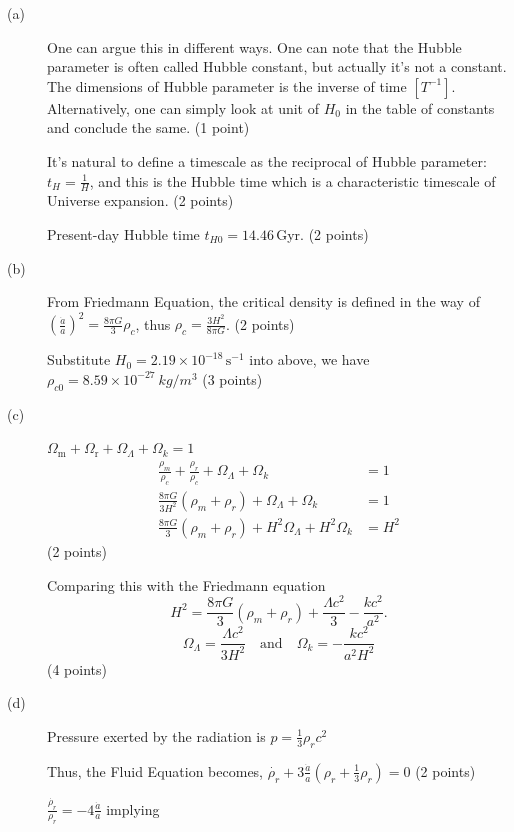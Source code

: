 \begin{description}
\item[(a)] One can argue this in different ways. One can note that the
  Hubble parameter is often called Hubble constant, but actually it's not a
  constant. The dimensions of Hubble parameter is the inverse of time
  $[T^{-1}]$. Alternatively, one can simply look at unit of $H_0$ in the
  table of constants and conclude the same. \hfill(1 point)

  It's natural to define a timescale as the reciprocal of Hubble
  parameter: $t_H = \frac{1}{H}$, and this is the Hubble time which is a
  characteristic timescale of Universe expansion. \hfill(2 points)

  Present-day Hubble time $t_{H0} = 14.46$\,Gyr. \hfill(2 points)

\item[(b)] From Friedmann Equation, the critical density is defined in the
  way of
  $\left(\frac{\dot{a}}{a}\right)^2 = \frac{8\pi G}{3}\rho_c$, thus
  $\rho_c = \frac{3H^2}{8\pi G}$. \hfill(2 points)

  Substitute $H_0 = 2.19\times 10^{-18}\,\mathrm{s^{-1}}$ into above, we
  have $\rho_{c0} = 8.59\times 10^{-27}\ kg/m^3$ \hfill(3 points)

\item[(c)] $\Omega_{\mathrm{m}} + \Omega_{\mathrm{r}} + \Omega_\Lambda
  + \Omega_k = 1$
  \begin{align*}
  \frac{\rho_m}{\rho_c} + \frac{\rho_r}{\rho_c}
    + \Omega_\Lambda + \Omega_k &= 1\\
  \frac{8\pi G}{3H^2}(\rho_m + \rho_r)
    + \Omega_\Lambda + \Omega_k &= 1\\
  \frac{8\pi G}{3}(\rho_m + \rho_r)
    + H^2\Omega_\Lambda + H^2\Omega_k &= H^2
  \end{align*}
  \hfill(2 points)

  Comparing this with the Friedmann equation
  \[ H^2 = \frac{8\pi G}{3}(\rho_m + \rho_r)
     + \frac{\Lambda c^2}{3} - \frac{kc^2}{a^2}. \]
  \[ \Omega_\Lambda = \frac{\Lambda c^2}{3H^2}
     \quad\text{and}\quad
     \Omega_k = -\frac{kc^2}{a^2 H^2} \]
  \hfill(4 points)

\item[(d)] Pressure exerted by the radiation is
  $p = \frac{1}{3}\rho_r c^2$

  Thus, the Fluid Equation becomes,
  $\dot{\rho_r} + 3\frac{\dot{a}}{a}
   \left(\rho_r + \frac{1}{3}\rho_r\right) = 0$ \hfill(2 points)

  $\frac{\dot{\rho_r}}{\rho_r} = -4\frac{\dot{a}}{a}$ implying


\end{description}
